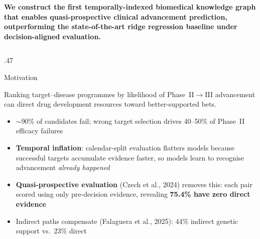 \documentclass[final,t]{beamer}
\begin{document}
\begin{frame}[t]
\vspace{0.4cm}

\begin{tcolorbox}[
  colback=qmulgold!12, colframe=qmulgold, boxrule=2.5pt, arc=5pt,
  left=10mm, right=10mm, top=5mm, bottom=5mm
]
\centering
{\Large\bfseries\color{qmulblue}
We construct the first temporally-indexed biomedical knowledge graph that enables quasi-prospective clinical advancement prediction, outperforming the state-of-the-art ridge regression baseline under decision-aligned evaluation.}
\end{tcolorbox}

\vspace{0.15cm}

\begin{columns}[T]

\begin{column}{.47\linewidth}

\begin{block}{Motivation}
{\normalsize
Ranking target--disease programmes by likelihood of Phase~II$\rightarrow$III advancement can direct drug development resources toward better-supported bets.

\vspace{0.15cm}

\begin{itemize}
  \item $\sim$90\% of candidates fail; wrong target selection drives 40--50\% of Phase~II efficacy failures
  \item \textbf{Temporal inflation}: calendar-split evaluation flatters models because successful targets accumulate evidence faster, so models learn to recognise advancement \emph{already happened}
  \item \textbf{Quasi-prospective evaluation} (Czech et al., 2024) removes this: each pair scored using only pre-decision evidence, revealing \textbf{75.4\% have zero direct evidence}
  \item Indirect paths compensate (Falaguera et al., 2025): 44\% indirect genetic support vs.\ 23\% direct
\end{itemize}
}
\end{block}


\end{column}
\end{columns}
\end{frame}
\end{document}
